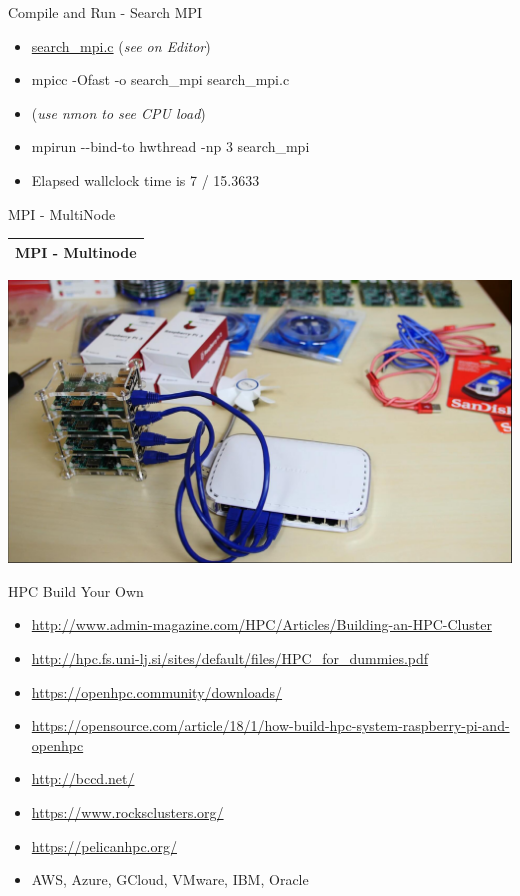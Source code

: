\documentclass[ignorenonframetext,]{beamer}
\providecommand{\tightlist}{%
  \setlength{\itemsep}{0pt}\setlength{\parskip}{0pt}}
\begin{document}
\begin{frame}{Compile and Run - Search MPI}

\begin{itemize}
\tightlist
\item
  \url{search_mpi.c} (\emph{see on Editor})
\item
  mpicc -Ofast -o search\_mpi search\_mpi.c
\item
  (\emph{use nmon to see CPU load})
\item
  mpirun -\/-bind-to hwthread -np 3 search\_mpi
\end{itemize}


\begin{itemize}
\tightlist
\item
  Elapsed wallclock time is 7 / 15.3633
\end{itemize}


\end{frame}

\begin{frame}{MPI - MultiNode}

\begin{longtable}[]{@{}l@{}}
\toprule
\endhead
MPI - Multinode\tabularnewline
\bottomrule
\end{longtable}

\includegraphics{images/PI-Cluster.jpg}

\end{frame}

\begin{frame}{HPC Build Your Own}

\begin{itemize}
\tightlist
\item
  \url{http://www.admin-magazine.com/HPC/Articles/Building-an-HPC-Cluster}
\item
  \url{http://hpc.fs.uni-lj.si/sites/default/files/HPC_for_dummies.pdf}
\item
  \url{https://openhpc.community/downloads/}
\item
  \url{https://opensource.com/article/18/1/how-build-hpc-system-raspberry-pi-and-openhpc}
\item
  \url{http://bccd.net/}
\item
  \url{https://www.rocksclusters.org/}
\item
  \url{https://pelicanhpc.org/}
\item
  AWS, Azure, GCloud, VMware, IBM, Oracle
\end{itemize}

\end{frame}
\end{document}
